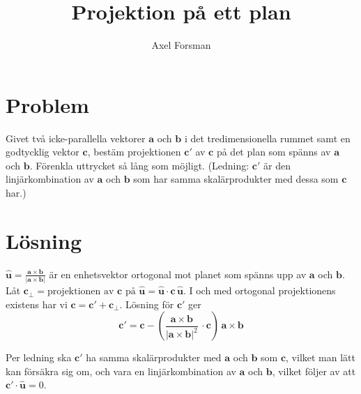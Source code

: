 \documentclass{article}
\author{Axel Forsman}
\title{Projektion på ett plan}
\renewcommand{\vec}[1]{\mathbf{#1}}
\begin{document}
\maketitle

\section*{Problem}
Givet två icke-parallella vektorer $\vec{a}$ och $\vec{b}$ i det
tredimensionella rummet samt en godtycklig vektor $\vec{c}$,
bestäm projektionen $\vec{c'}$ av $\vec{c}$
på det plan som spänns av $\vec{a}$ och $\vec{b}$.
Förenkla uttrycket så lång som möjligt.
(Ledning: $\vec{c'}$ är den linjärkombination av $\vec{a}$ och $\vec{b}$
som har samma skalärprodukter med dessa som $\vec{c}$ har.)

\section*{Lösning}
$\vec{\hat{u}} = \frac{\vec{a} \times \vec{b}}{\lvert \vec{a} \times \vec{b} \rvert}$
är en enhetsvektor ortogonal mot planet som spänns upp av $\vec{a}$ och $\vec{b}$.
Låt $\vec{c_\perp} = \text{projektionen av $\vec{c}$ på $\vec{\hat{u}}$}
	= \vec{\hat{u}} \cdot \vec{c} \, \vec{\hat{u}}$.
I och med ortogonal projektionens existens har vi $\vec{c} = \vec{c'} + \vec{c_\perp}$.
Lösning för $\vec{c'}$ ger
$$ \vec{c'} = \vec{c} - \left( \frac{\vec{a} \times \vec{b}}{\lvert \vec{a} \times \vec{b} \rvert^2}
	\, \cdot \vec{c} \right) \, \vec{a} \times \vec{b} $$

Per ledning ska $\vec{c'}$ ha samma skalärprodukter med $\vec{a}$ och $\vec{b}$ som $\vec{c}$,
vilket man lätt kan försäkra sig om,
och vara en linjärkombination av $\vec{a}$ och $\vec{b}$,
vilket följer av att $\vec{c'} \cdot \vec{\hat{u}} = 0$.
\end{document}
